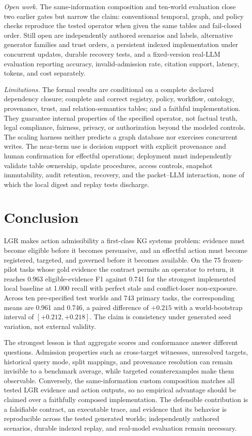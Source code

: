\documentclass[conference]{IEEEtran}
\newcommand{\lgr}{\textsc{LGR}\xspace}
\begin{document}
\textit{Open work.} The same-information composition and ten-world evaluation close two earlier gates but narrow the claim: conventional temporal, graph, and policy checks reproduce the tested operator when given the same tables and fail-closed order. Still open are independently authored scenarios and labels, alternative generator families and trust orders, a persistent indexed implementation under concurrent updates, durable recovery tests, and a fixed-version real-LLM evaluation reporting accuracy, invalid-admission rate, citation support, latency, tokens, and cost separately.

\textit{Limitations.}\label{sec:limitations} The formal results are conditional on a complete declared dependency closure; complete and correct registry, policy, workflow, ontology, provenance, trust, and relation-semantics tables; and a faithful implementation. They guarantee internal properties of the specified operator, not factual truth, legal compliance, fairness, privacy, or authorization beyond the modeled controls. The scaling harness neither predicts a graph database nor exercises concurrent writes. The near-term use is decision support with explicit provenance and human confirmation for effectful operations; deployment must independently validate table ownership, update procedures, access controls, snapshot immutability, audit retention, recovery, and the packet--LLM interaction, none of which the local digest and replay tests discharge.

\section{Conclusion}
\lgr makes action admissibility a first-class KG systems problem: evidence must become eligible before it becomes persuasive, and an effectful action must become registered, targeted, and governed before it becomes available. On the 75 frozen-pilot tasks whose gold evidence the contract permits an operator to return, it reaches 0.963 eligible-evidence F1 against 0.741 for the strongest implemented local baseline at 1.000 recall with perfect stale and conflict-loser non-exposure. Across ten pre-specified test worlds and 743 primary tasks, the corresponding means are 0.961 and 0.746, a paired difference of $+0.215$ with a world-bootstrap interval of $[+0.212,+0.218]$. The claim is consistency under generated seed variation, not external validity.

The strongest lesson is that aggregate scores and conformance answer different questions. Admission properties such as cross-target witnesses, unresolved targets, historical query mode, split mappings, and provenance resolution can remain invisible to a benchmark average, while targeted counterexamples make them observable. Conversely, the same-information custom composition matches all tested \lgr{} evidence and action outputs, so no empirical advantage should be claimed over a faithfully composed implementation. The defensible contribution is a falsifiable contract, an executable trace, and evidence that its behavior is reproducible across the tested generated worlds; independently authored scenarios, durable indexed replay, and real-model evaluation remain necessary.
\end{document}
